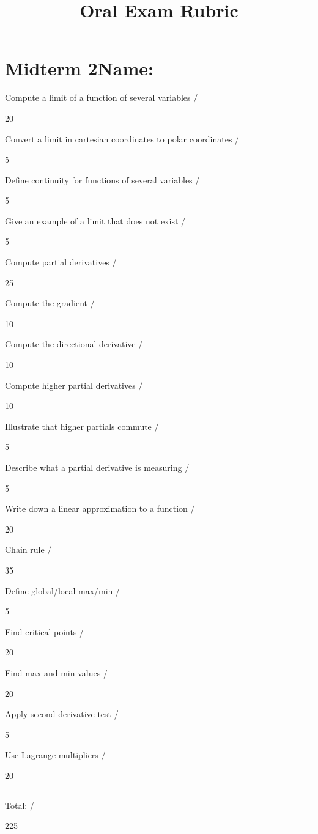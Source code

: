 \documentclass[11pt]{article}
\title{Oral Exam Rubric}
\newcommand{\points}[1]{\fbox{\parbox{2em}{\null\vspace{1em}\hspace{2em}}}/\parbox{1em}{#1}}
\begin{document}
\section*{Midterm 2\hfill Name: \hspace{5em}\null}

\noindent
Compute a limit of a function of several variables
\dotfill
\points{20}
\vfill

\noindent
Convert a limit in cartesian coordinates to polar coordinates
\dotfill
\points{5}
\vfill

\noindent
Define continuity for functions of several variables
\dotfill
\points{5}
\vfill

\noindent
Give an example of a limit that does not exist
\dotfill
\points{5}
\vfill

\noindent
Compute partial derivatives
\dotfill
\points{25}
\vfill

\noindent
Compute the gradient
\dotfill
\points{10}
\vfill

\noindent
Compute the directional derivative
\dotfill
\points{10}
\vfill

\noindent
Compute higher partial derivatives
\dotfill
\points{10}
\vfill

\noindent
Illustrate that higher partials commute
\dotfill
\points{5}
\vfill

\noindent
Describe what a partial derivative is measuring
\dotfill
\points{5}
\vfill

\noindent
Write down a linear approximation to a function
\dotfill
\points{20}
\vfill

\noindent
Chain rule
\dotfill
\points{35}
\vfill

\noindent
Define global/local  max/min
\dotfill
\points{5}
\vfill

\noindent
Find critical points
\dotfill
\points{20}
\vfill

\noindent
Find max and min values
\dotfill
\points{20}
\vfill

\noindent
Apply second derivative test
\dotfill
\points{5}
\vfill

\noindent
Use Lagrange multipliers
\dotfill
\points{20}
\vfill

\vspace{1ex}
\hrule
\vspace{1ex}

\noindent
Total:
\dotfill
\points{225}
\vfill
\end{document}
